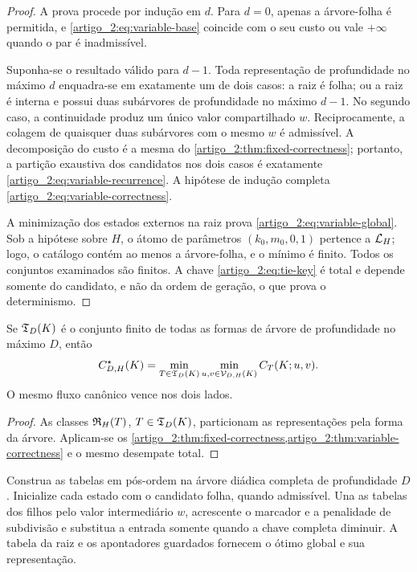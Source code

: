 \begin{proof}
A prova procede por indução em $d$. Para $d=0$, apenas a árvore-folha é permitida,
e \eqref{artigo_2:eq:variable-base} coincide com o seu custo ou vale $+\infty$ quando o
par é inadmissível.

Suponha-se o resultado válido para $d-1$. Toda representação de profundidade no máximo
$d$ enquadra-se em exatamente um de dois casos: a raiz é folha; ou a raiz é interna
e possui duas subárvores de profundidade no máximo $d-1$. No segundo caso, a
continuidade produz um único valor compartilhado $w$. Reciprocamente, a
colagem de quaisquer duas subárvores com o mesmo $w$ é admissível. A
decomposição do custo é a mesma do \cref{artigo_2:thm:fixed-correctness}; portanto, a
partição exaustiva dos candidatos nos dois casos é exatamente
\eqref{artigo_2:eq:variable-recurrence}. A hipótese de indução completa
\eqref{artigo_2:eq:variable-correctness}.

A minimização dos estados externos na raiz prova \eqref{artigo_2:eq:variable-global}. Sob a
hipótese sobre $H$, o átomo de parâmetros $(k_0,m_0,0,1)$ pertence a
$\mathcal{L}_H$; logo, o catálogo contém ao menos a árvore-folha, e o mínimo é
finito. Todos os conjuntos examinados são finitos. A chave
\eqref{artigo_2:eq:tie-key} é total e depende somente do candidato, e não da ordem de
geração, o que prova o determinismo.
\end{proof}

\begin{corollary}\label{map:artigo_2:7.3}
\label{artigo_2:cor:shape-enumeration}
Se $\mathfrak{T}_D(K)$ é o conjunto finito de todas as formas de árvore de
profundidade no máximo $D$, então
\begin{equation}
 C_{D,H}^{\star}(K)
 =\min_{T\in\mathfrak{T}_D(K)}
   \min_{u,v\in\mathcal{V}_{D,H}(K)}C_T(K;u,v).
 \label{artigo_2:eq:shape-equivalence}
\end{equation}
O mesmo fluxo canônico vence nos dois lados.
\end{corollary}

\begin{proof}
As classes $\mathfrak{R}_H(T)$, $T\in\mathfrak{T}_D(K)$, particionam as
representações pela forma da árvore. Aplicam-se os
\cref{artigo_2:thm:fixed-correctness,artigo_2:thm:variable-correctness} e o mesmo desempate
total.
\end{proof}

\begin{algorithm}\label{map:artigo_2:7.4}
\label{artigo_2:alg:variable-tree}
Construa as tabelas em pós-ordem na árvore diádica completa de profundidade
$D$. Inicialize cada estado com o candidato folha, quando admissível. Una as
tabelas dos filhos pelo valor intermediário $w$, acrescente o marcador e a
penalidade de subdivisão e substitua a entrada somente quando a chave completa
diminuir. A tabela da raiz e os apontadores guardados fornecem o ótimo global
e sua representação.
\end{algorithm}

